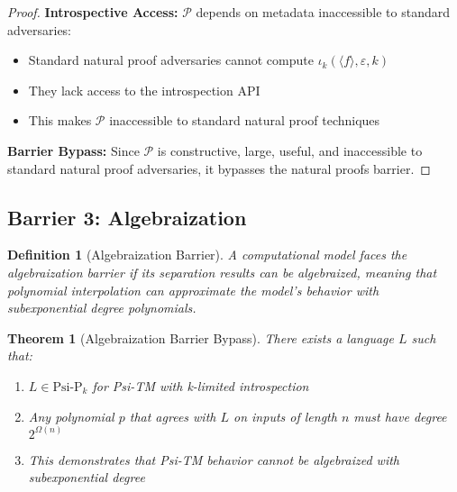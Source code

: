 \documentclass[11pt]{article}
\newtheorem{definition}{Definition}
\newtheorem{theorem}{Theorem}
\begin{document}
\begin{proof}
\textbf{Introspective Access:} $\mathcal{P}$ depends on metadata inaccessible to standard adversaries:
\begin{itemize}
\item Standard natural proof adversaries cannot compute $\iota_k(\langle f \rangle, \varepsilon, k)$
\item They lack access to the introspection API
\item This makes $\mathcal{P}$ inaccessible to standard natural proof techniques
\end{itemize}

\textbf{Barrier Bypass:}
Since $\mathcal{P}$ is constructive, large, useful, and inaccessible to standard natural proof adversaries, it bypasses the natural proofs barrier.
\end{proof}

\subsection{Barrier 3: Algebraization}

\begin{definition}[Algebraization Barrier]
A computational model faces the algebraization barrier if its separation results can be algebraized, meaning that polynomial interpolation can approximate the model's behavior with subexponential degree polynomials.
\end{definition}

\begin{theorem}[Algebraization Barrier Bypass]
There exists a language $L$ such that:
\begin{enumerate}
\item $L \in \text{Psi-P}_k$ for Psi-TM with k-limited introspection
\item Any polynomial $p$ that agrees with $L$ on inputs of length $n$ must have degree $2^{\Omega(n)}$
\item This demonstrates that Psi-TM behavior cannot be algebraized with subexponential degree
\end{enumerate}
\end{theorem}
\end{document}
